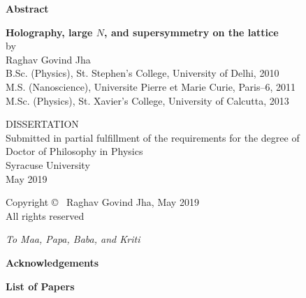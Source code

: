 \newpage
\thispagestyle{empty}
\begin{center}
{\bf\Large Abstract}\\[0.5em]
\end{center}

\begin{quote}

\end{quote}


\newpage
\thispagestyle{empty}

\begin{center}
{\bf\LARGE Holography, large $N$, and supersymmetry on the lattice}\\
[3em]
 by\\[1em]
{\large Raghav Govind Jha\\[1em]
B.Sc. (Physics), St. Stephen's College, University of Delhi, 2010\\
M.S. (Nanoscience), Universite Pierre et Marie Curie, Paris--6, 2011\\
M.Sc. (Physics), St. Xavier's College, University of Calcutta, 2013 \\ 
}
\end{center}

\begin{center}
DISSERTATION\\
Submitted in partial fulfillment of the requirements for the degree of\\
Doctor of Philosophy in Physics\\[7em]
Syracuse University\\
{ May 2019}\\[5em]

\end{center}

\newpage
\thispagestyle{empty}
\begin{center}
\vspace*{3in}
Copyright \copyright ~ Raghav Govind Jha, May 2019  \\ 
\noindent All rights reserved
\end{center}


\newpage
\thispagestyle{empty}
\clearpage
\vspace*{1in}
\begin{center}
{\textit{To Maa, Papa, Baba, and Kriti}} \\
	\vspace{2 cm}
	\vspace{5 cm}
\end{center}
\clearpage

\newpage 




\begin{center}
{\bf\Large Acknowledgements}\\[0.5em]
\end{center}

        

\newpage

\begin{center}
	{\bf\Large List of Papers}
\end{center}


   
\newpage
    \tableofcontents

 
\newpage    \listoffigures
\newpage    \listoftables

\newpage
